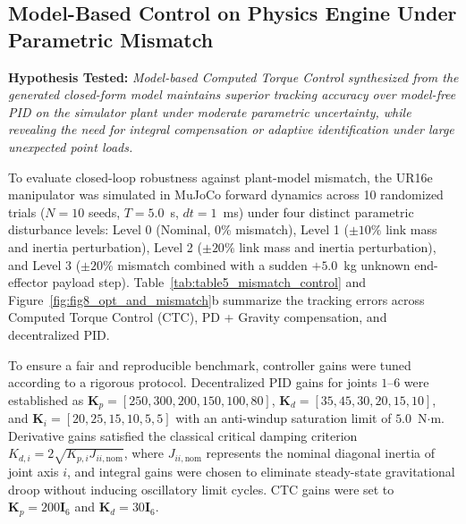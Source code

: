 \documentclass[fleqn,10pt]{article}
\begin{document}
\subsection{Model-Based Control on Physics Engine Under Parametric Mismatch}

\noindent\textbf{Hypothesis Tested:} \textit{Model-based Computed Torque Control synthesized from the generated closed-form model maintains superior tracking accuracy over model-free PID on the simulator plant under moderate parametric uncertainty, while revealing the need for integral compensation or adaptive identification under large unexpected point loads.}

To evaluate closed-loop robustness against plant-model mismatch, the UR16e manipulator was simulated in MuJoCo forward dynamics across 10 randomized trials ($N=10$ seeds, $T=5.0$~s, $dt=1$~ms) under four distinct parametric disturbance levels: Level 0 (Nominal, 0\% mismatch), Level 1 ($\pm 10\%$ link mass and inertia perturbation), Level 2 ($\pm 20\%$ link mass and inertia perturbation), and Level 3 ($\pm 20\%$ mismatch combined with a sudden $+5.0$~kg unknown end-effector payload step). Table~\ref{tab:table5_mismatch_control} and Figure~\ref{fig:fig8_opt_and_mismatch}b summarize the tracking errors across Computed Torque Control (CTC), PD + Gravity compensation, and decentralized PID.

To ensure a fair and reproducible benchmark, controller gains were tuned according to a rigorous protocol. Decentralized PID gains for joints $1$--$6$ were established as $\bm{K}_p = [250, 300, 200, 150, 100, 80]$, $\bm{K}_d = [35, 45, 30, 20, 15, 10]$, and $\bm{K}_i = [20, 25, 15, 10, 5, 5]$ with an anti-windup saturation limit of $5.0$~N$\cdot$m. Derivative gains satisfied the classical critical damping criterion $K_{d,i} = 2\sqrt{K_{p,i} J_{ii,\text{nom}}}$, where $J_{ii,\text{nom}}$ represents the nominal diagonal inertia of joint axis $i$, and integral gains were chosen to eliminate steady-state gravitational droop without inducing oscillatory limit cycles. CTC gains were set to $\bm{K}_p = 200 \bm{I}_6$ and $\bm{K}_d = 30 \bm{I}_6$.
\end{document}
